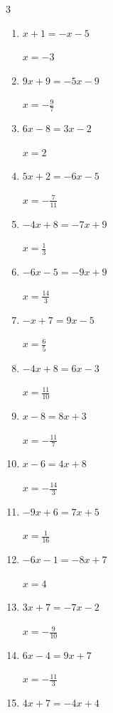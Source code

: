 \begin{multicols}{3}
\begin{enumerate}
  \item $x+1=-x-5$

        $\displaystyle x=-3$

  \item $9x+9=-5x-9$

        $\displaystyle x=-\frac{9}{7}$

  \item $6x-8=3x-2$

        $\displaystyle x=2$

  \item $5x+2=-6x-5$

        $\displaystyle x=-\frac{7}{11}$

  \item $-4x+8=-7x+9$

        $\displaystyle x=\frac{1}{3}$

  \item $-6x-5=-9x+9$

        $\displaystyle x=\frac{14}{3}$

  \item $-x+7=9x-5$

        $\displaystyle x=\frac{6}{5}$

\columnbreak %

  \item $-4x+8=6x-3$

        $\displaystyle x=\frac{11}{10}$

  \item $x-8=8x+3$

        $\displaystyle x=-\frac{11}{7}$

  \item $x-6=4x+8$

        $\displaystyle x=-\frac{14}{3}$

  \item $-9x+6=7x+5$

        $\displaystyle x=\frac{1}{16}$

  \item $-6x-1=-8x+7$

        $\displaystyle x=4$

  \item $3x+7=-7x-2$

        $\displaystyle x=-\frac{9}{10}$

  \item $6x-4=9x+7$

        $\displaystyle x=-\frac{11}{3}$

  \item $4x+7=-4x+4$


\end{enumerate}
\end{multicols}
